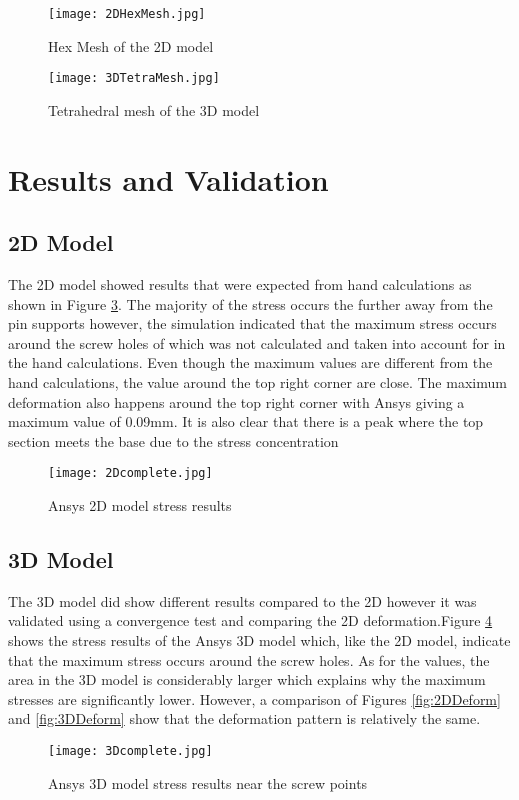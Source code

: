 \documentclass[a4paper]{article}
\begin{document}
\begin{figure}[h!]
	\centering
	\texttt{[image: 2DHexMesh.jpg]}
	\caption{\label{fig:2DHexMesh} Hex Mesh of the 2D model}
\end{figure}
\begin{figure}[h!]
	\centering
	\texttt{[image: 3DTetraMesh.jpg]}
	\caption{\label{fig:3DTetraMesh} Tetrahedral mesh of the 3D model}
\end{figure}
\newpage
\section{Results and Validation}
\subsection{2D Model}
The 2D model showed results that were expected from hand calculations as shown in Figure \ref{fig:2DStress}. The majority of the stress occurs the further away from the pin supports however, the simulation indicated that the maximum stress occurs around the screw holes of which was not calculated and taken into account for in the hand calculations. Even though the maximum values are different from the hand calculations, the value around the top right corner are close. The maximum deformation also happens around the top right corner with Ansys giving a maximum value of 0.09mm. It is also clear that there is a peak where the top section meets the base due to the stress concentration
\begin{figure}[h]
	\centering
	\texttt{[image: 2Dcomplete.jpg]}
	\caption{\label{fig:2DStress} Ansys 2D model stress results }
\end{figure}
\newpage
\subsection{3D Model}
The 3D model did show different results compared to the 2D however it was validated using a convergence test and comparing the 2D deformation.Figure \ref{fig:3DStress} shows the stress results of the Ansys 3D model which, like the 2D model, indicate that the maximum stress occurs around the screw holes. As for the values, the area in the 3D model is considerably larger which explains why the maximum stresses are significantly lower. However, a comparison of Figures \ref{fig:2DDeform} and \ref{fig:3DDeform} show that the deformation pattern is relatively the same. 
\begin{figure}[h]
	\centering
	\texttt{[image: 3Dcomplete.jpg]}
	\caption{\label{fig:3DStress} Ansys 3D model stress results near the screw points }
\end{figure} 
\end{document}
